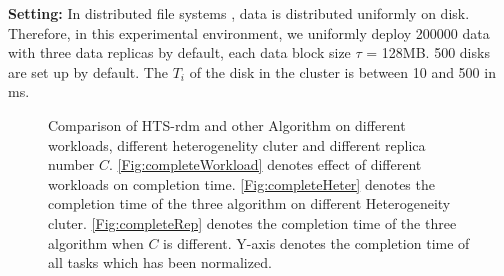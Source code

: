 \documentclass[conference]{IEEEtran}
\begin{document}
\textbf{Setting:}
In distributed file systems \cite{b19}, data is distributed uniformly on disk. Therefore, in this experimental environment, we uniformly deploy 200000 data with three data replicas by default, each data block size $\tau$ = 128MB. 500 disks are set up by default. The $T_i$ of the disk in the cluster is between 10 and 500 in ms. 


\begin{figure}[!t]
	\centering
	\quad\quad %
	\quad\quad
	\vspace{-1ex}
	\caption{Comparison of HTS-rdm and other Algorithm on different workloads, different heterogenelity cluter and different replica number $C$. \ref{Fig:completeWorkload} denotes effect of different workloads on completion time. \ref{Fig:completeHeter} denotes the completion time of the three algorithm on different Heterogeneity cluter. \ref{Fig:completeRep} denotes the completion time of the three algorithm when $C$ is different. Y-axis denotes the completion time of all tasks which has been normalized.}
	\label{Fig:complete}
	\vspace{-3ex}
\end{figure}
\end{document}
